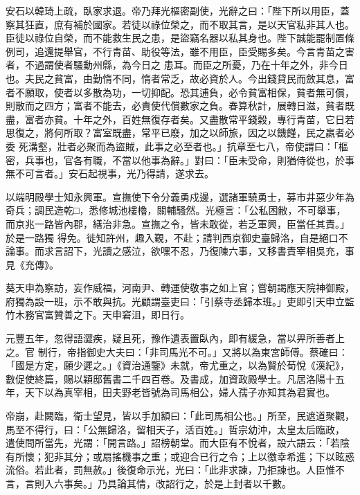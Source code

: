 \begin{pinyinscope}
 安石以韓琦上疏，臥家求退。帝乃拜光樞密副使，光辭之曰：「陛下所以用臣，蓋察其狂直，庶有補於國家。若徒以祿位榮之，而不取其言，是以天官私非其人也。臣徒以祿位自榮，而不能救生民之患，是盜竊名器以私其身也。陛下誠能罷制置條例司，追還提舉官，不行青苗、助役等法，雖不用臣，臣受賜多矣。今言青苗之害者，不過謂使者騷動州縣，為今日之
 患耳。而臣之所憂，乃在十年之外，非今日也。夫民之貧富，由勤惰不同，惰者常乏，故必資於人。今出錢貸民而斂其息，富者不願取，使者以多散為功，一切抑配。恐其逋負，必令貧富相保，貧者無可償，則散而之四方；富者不能去，必責使代償數家之負。春算秋計，展轉日滋，貧者既盡，富者亦貧。十年之外，百姓無復存者矣。又盡散常平錢穀，專行青苗，它日若思復之，將何所取？富室既盡，常平已廢，加之以師旅，因之以饑饉，民之羸者必委
 死溝壑，壯者必聚而為盜賊，此事之必至者也。」抗章至七八，帝使謂曰：「樞密，兵事也，官各有職，不當以他事為辭。」對曰：「臣未受命，則猶侍從也，於事無不可言者。」安石起視事，光乃得請，遂求去。



 以端明殿學士知永興軍。宣撫使下令分義勇戍邊，選諸軍驍勇士，募市井惡少年為奇兵；調民造乾□，悉修城池樓櫓，關輔騷然。光極言：「公私困敝，不可舉事，而京兆一路皆內郡，繕治非急。宣撫之令，皆未敢從，若乏軍興，臣當任其責。」於是一路獨
 得免。徙知許州，趣入覲，不赴；請判西京御史臺歸洛，自是絕口不論事。而求言詔下，光讀之感泣，欲嘿不忍，乃復陳六事，又移書責宰相吳充，事見《充傳》。



 葵天申為察訪，妄作威福，河南尹、轉運使敬事之如上官；嘗朝謁應天院神御殿，府獨為設一班，示不敢與抗。光顧謂臺吏曰：「引蔡寺丞歸本班。」吏即引天申立監竹木務官富贊善之下。天申窘沮，即日行。



 元豐五年，忽得語澀疾，疑且死，豫作遺表置臥內，即有緩急，當以畀所善者上之。官
 制行，帝指御史大夫曰：「非司馬光不可。」又將以為東宮師傅。蔡確曰：「國是方定，願少遲之。」《資治通鑒》未就，帝尤重之，以為賢於荀悅《漢紀》，數促使終篇，賜以穎邸舊書二千四百卷。及書成，加資政殿學士。凡居洛陽十五年，天下以為真宰相，田夫野老皆號為司馬相公，婦人孺子亦知其為君實也。



 帝崩，赴闕臨，衛士望見，皆以手加額曰：「此司馬相公也。」所至，民遮道聚觀，馬至不得行，曰：「公無歸洛，留相天子，活百姓。」哲宗幼沖，太皇太后臨政，
 遣使問所當先，光謂：「開言路。」詔榜朝堂。而大臣有不悅者，設六語云：「若陰有所懷；犯非其分；或扇搖機事之重；或迎合已行之令；上以徼幸希進；下以眩惑流俗。若此者，罰無赦。」後復命示光，光曰：「此非求諫，乃拒諫也。人臣惟不言，言則入六事矣。」乃具論其情，改詔行之，於是上封者以千數。




\end{pinyinscope}
